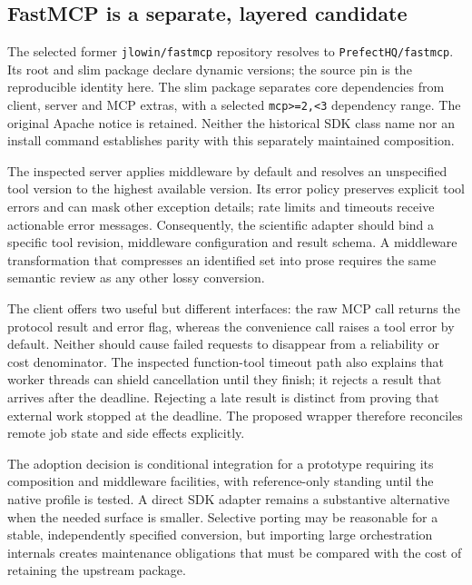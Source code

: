 \subsection{FastMCP is a separate, layered candidate}

The selected former \texttt{jlowin/fastmcp} repository resolves to
\texttt{PrefectHQ/fastmcp}. Its root and slim package declare dynamic versions;
the source pin is the reproducible identity here. The slim package separates
core dependencies from client, server and MCP extras, with a selected
\texttt{mcp>=2,<3} dependency range. The original Apache notice is retained.
Neither the historical SDK class name nor an install command establishes
parity with this separately maintained composition.
\citep{exec24_mcp_fastmcp}

The inspected server applies middleware by default and resolves an unspecified
tool version to the highest available version. Its error policy preserves
explicit tool errors and can mask other exception details; rate limits and
timeouts receive actionable error messages. Consequently, the scientific
adapter should bind a specific tool revision, middleware configuration and
result schema. A middleware transformation that compresses an identified
set into prose requires the same semantic review as any other lossy
conversion.~\citep{exec24_mcp_fastmcp,exec24_mcp_contracts}

The client offers two useful but different interfaces: the raw MCP call
returns the protocol result and error flag, whereas the convenience call
raises a tool error by default. Neither should cause failed requests to
disappear from a reliability or cost denominator. The inspected function-tool
timeout path also explains that worker threads can shield cancellation until
they finish; it rejects a result that arrives after the deadline. Rejecting
a late result is distinct from proving that external work stopped at the
deadline. The proposed wrapper therefore reconciles remote job state and
side effects explicitly.~\citep{exec24_mcp_fastmcp}

The adoption decision is conditional integration for a prototype requiring
its composition and middleware facilities, with reference-only standing
until the native profile is tested. A direct SDK adapter remains a substantive
alternative when the needed surface is smaller. Selective porting may be
reasonable for a stable, independently specified conversion, but importing
large orchestration internals creates maintenance obligations that must be
compared with the cost of retaining the upstream package.
\citep{exec24_mcp_contracts}

